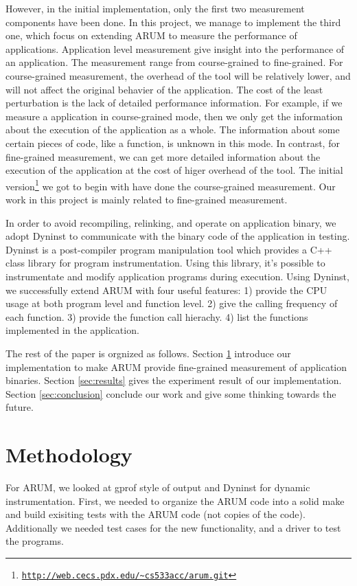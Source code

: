 \documentclass[11pt,letterpaper,oneside]{article}
\begin{document}
However, in the initial implementation, only the first two measurement components have been done. In this project, we manage to implement the third one, which focus on extending ARUM to measure the performance of applications. Application level measurement give insight into the performance of an application. The measurement range from course-grained to fine-grained. For course-grained measurement, the overhead of the tool will be relatively lower, and will not affect the original behavier of the application. The cost of the least perturbation is the lack of detailed performance information. For example, if we measure a application in course-grained mode, then we only get the information about the execution of the application as a whole. The information about some certain pieces of code, like a function, is unknown in this mode. In contrast, for fine-grained measurement, we can get more detailed information about the execution of the application at the cost of higer overhead of the tool. The initial version\footnote{\texttt{\url{http://web.cecs.pdx.edu/~cs533acc/arum.git}}} we got to begin with have done the course-grained measurement. Our work in this project is mainly related to fine-grained measurement.

In order to avoid recompiling, relinking, and operate on application binary, we adopt Dyninst \cite{bib:dyninstweb} to communicate with the binary code of the application in testing. Dyninst is \cite{bib:anapi} a post-compiler program manipulation tool which provides a C++ class library for program instrumentation. Using this library, it's possible to instrumentate and modify application programs during execution. Using Dyninst, we successfully extend ARUM with four useful features: 1) provide the CPU usage at both program level and function level. 2) give the calling frequency of each function. 3) provide the function call hierachy. 4) list the functions implemented in the application.

The rest of the paper is orgnized as follows. Section \ref{sec:methodology} introduce our implementation to make ARUM provide fine-grained measurement of application binaries. Section \ref{sec:results} gives the experiment result of our implementation. Section \ref{sec:conclusion} conclude our work and give some thinking towards the future.

\section{Methodology}
\label{sec:methodology}
For ARUM, we looked at gprof style of output and Dyninst for dynamic instrumentation.  First, we needed to organize the ARUM code into a solid make and build exisiting tests with the ARUM code (not copies of the code). Additionally we needed test cases for the new functionality, and a driver to test the programs.
\end{document}
